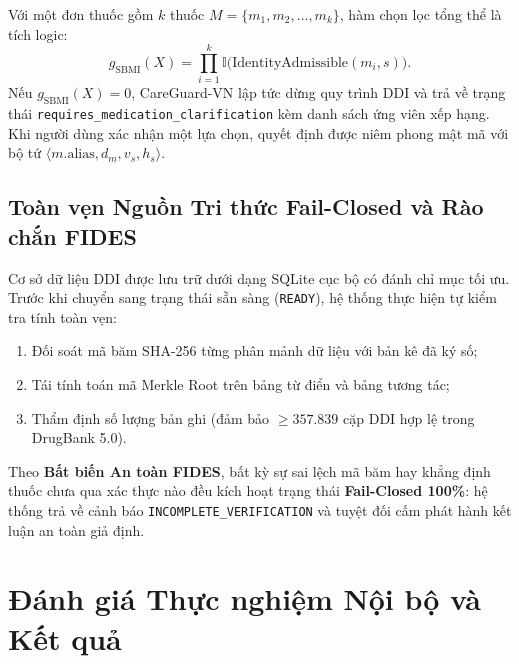 \documentclass[11pt]{article}
\begin{document}
Với một đơn thuốc gồm $k$ thuốc $M = \{m_1, m_2, \dots, m_k\}$, hàm chọn lọc tổng thể là tích logic:
\begin{equation}
g_{\text{SBMI}}(X) = \prod_{i=1}^k \mathbb{I}\Big(\mathrm{IdentityAdmissible}(m_i, s)\Big).
\end{equation}
Nếu $g_{\text{SBMI}}(X) = 0$, CareGuard-VN lập tức dừng quy trình DDI và trả về trạng thái \texttt{requires\_medication\_clarification} kèm danh sách ứng viên xếp hạng. Khi người dùng xác nhận một lựa chọn, quyết định được niêm phong mật mã với bộ tứ $\langle m.\text{alias}, d_m, v_s, h_s \rangle$.

\subsection{Toàn vẹn Nguồn Tri thức Fail-Closed và Rào chắn FIDES}
Cơ sở dữ liệu DDI được lưu trữ dưới dạng SQLite cục bộ có đánh chỉ mục tối ưu. Trước khi chuyển sang trạng thái sẵn sàng (\texttt{READY}), hệ thống thực hiện tự kiểm tra tính toàn vẹn:
\begin{enumerate}
  \item Đối soát mã băm SHA-256 từng phân mảnh dữ liệu với bản kê đã ký số;
  \item Tái tính toán mã Merkle Root trên bảng từ điển và bảng tương tác;
  \item Thẩm định số lượng bản ghi (đảm bảo $\ge 357.839$ cặp DDI hợp lệ trong DrugBank 5.0).
\end{enumerate}
Theo \textbf{Bất biến An toàn FIDES}, bất kỳ sự sai lệch mã băm hay khẳng định thuốc chưa qua xác thực nào đều kích hoạt trạng thái \textbf{Fail-Closed 100\%}: hệ thống trả về cảnh báo \texttt{INCOMPLETE\_VERIFICATION} và tuyệt đối cấm phát hành kết luận an toàn giả định.

\section{Đánh giá Thực nghiệm Nội bộ và Kết quả}
\end{document}
